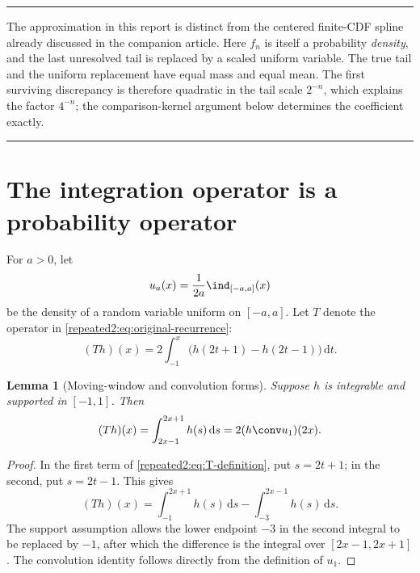 \documentclass[11pt,oneside]{article}
\newtheorem{lemma}[lemma]{Lemma}
\theoremstyle{definition}
\theoremstyle{remark}
\newcommand{\dd}{\,\mathrm d}
\newenvironment{boxedremark}{%
  \par\smallskip\noindent\begin{center}\begin{minipage}{0.94\textwidth}%
  \color{black}\hrule\vspace{0.6em}\small
}{%
  \vspace{0.6em}\hrule\end{minipage}\end{center}\smallskip
}
\begin{document}
\begin{boxedremark}
The approximation in this report is distinct from the centered finite-CDF spline already
discussed in the companion article.  Here $f_n$ is itself a probability \emph{density}, and
the last unresolved tail is replaced by a scaled uniform variable.  The true tail and the
uniform replacement have equal mass and equal mean.  The first surviving discrepancy is
therefore quadratic in the tail scale $2^{-n}$, which explains the factor $4^{-n}$; the
comparison-kernel argument below determines the coefficient exactly.
\end{boxedremark}

\section{The integration operator is a probability operator}
\label{repeated2:sec:probability-operator}

For $a>0$, let
\begin{equation}
 u_a(x)=\frac1{2a}\ind_{[-a,a]}(x)
 \label{repeated2:eq:uniform-density}
\end{equation}
be the density of a random variable uniform on $[-a,a]$.  Let $T$ denote the operator in
\eqref{repeated2:eq:original-recurrence}:
\begin{equation}
 (Th)(x)=2\int_{-1}^{x}\bigl(h(2t+1)-h(2t-1)\bigr)\dd t.
 \label{repeated2:eq:T-definition}
\end{equation}

\begin{lemma}[Moving-window and convolution forms]
\label{repeated2:lem:T-convolution}
Suppose $h$ is integrable and supported in $[-1,1]$.  Then
\begin{equation}
 (Th)(x)=\int_{2x-1}^{2x+1}h(s)\dd s
 =2(h\conv u_1)(2x).
 \label{repeated2:eq:T-moving-window}
\end{equation}
\end{lemma}

\begin{proof}
In the first term of \eqref{repeated2:eq:T-definition}, put $s=2t+1$; in the second, put
$s=2t-1$.  This gives
\[
 (Th)(x)=\int_{-1}^{2x+1}h(s)\dd s-\int_{-3}^{2x-1}h(s)\dd s.
\]
The support assumption allows the lower endpoint $-3$ in the second integral to be
replaced by $-1$, after which the difference is the integral over $[2x-1,2x+1]$.
The convolution identity follows directly from the definition of $u_1$.
\end{proof}
\end{document}
